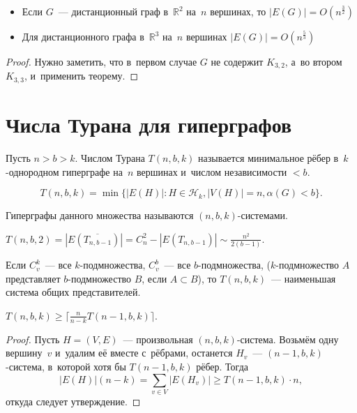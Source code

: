 \documentclass{article}
\begin{document}
\begin{claim}
	\begin{itemize}
		\item Если $G$~--- дистанционный граф в~$\mathbb{R}^2$ на~$n$ вершинах, то
			$|E(G)| = O(n^{\frac{3}{2}})$
		\item Для дистанционного графа в~$\mathbb{R}^3$ на~$n$ вершинах $|E(G)| =
			O(n^{\frac{5}{3}})$
	\end{itemize}
\end{claim}
\begin{proof}
	Нужно заметить, что в~первом случае $G$ не содержит $K_{3,2}$, а~во втором
	$K_{3,3}$, и~применить теорему.
\end{proof}

\section{Числа Турана для гиперграфов}

\begin{definition}
	Пусть $n > b > k$. Числом Турана $T(n, b, k)$ называется минимальное рёбер
	в~$k$-однородном гиперграфе на~$n$ вершинах и~числом независимости $<b$.

	$$T(n, b, k) = \min\{ |E(H)|: H \in \mathcal{H}_k, |V(H)| = n, \alpha(G) <
	b\}.$$

	Гиперграфы данного множества называются $(n, b, k)$-системами.
\end{definition}

\begin{example}
	$T(n, b, 2) = |E(\overline{T_{n,b-1}})| = C_n^2 - |E(T_{n,b-1})| \sim
	\frac{n^2}{2(b-1)}$.
\end{example}

Если $C_v^k$~--- все $k$-подмножества, $C_v^b$~--- все $b$-подмножества,
($k$-подмножество $A$ представляет $b$-подмножество $B$, если $A \subset B$), то
$T(n,b,k)$~--- наименьшая система общих представителей.

\begin{claim}
	$T(n,b,k) \ge \lceil \frac{n}{n-k} T(n - 1, b, k) \rceil$.
\end{claim}
\begin{proof}
	Пусть $H = (V, E)$~--- произвольная $(n,b,k)$-система. Возьмём одну
	вершину~$v$ и~удалим её вместе с~рёбрами, останется $H_v$~---
	$(n-1,b,k)$-система, в~которой хотя бы $T(n-1,b,k)$ рёбер. Тогда
	$$ |E(H)| (n - k) = \sum_{v \in V} |E(H_v)| \ge T(n - 1, b, k) \cdot n,$$
	откуда следует утверждение.
\end{proof}
\end{document}
